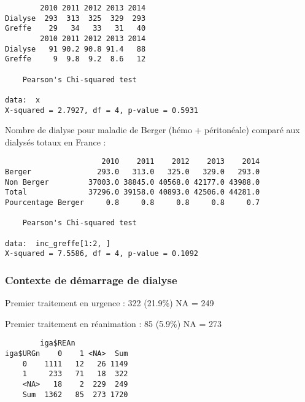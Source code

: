 \documentclass[11pt,a4paper]{article}\usepackage[]{graphicx}\usepackage[]{color}
\makeatletter
\newenvironment{kframe}{%
 \def\at@end@of@kframe{}%
 \ifinner\ifhmode%
  \def\at@end@of@kframe{\end{minipage}}%
  \begin{minipage}{\columnwidth}%
 \fi\fi%
 \def\FrameCommand##1{\hskip\@totalleftmargin \hskip-\fboxsep
 \colorbox{shadecolor}{##1}\hskip-\fboxsep
     \hskip-\linewidth \hskip-\@totalleftmargin \hskip\columnwidth}%
 \MakeFramed {\advance\hsize-\width
   \@totalleftmargin\z@ \linewidth\hsize
   \@setminipage}}%
 {\par\unskip\endMakeFramed%
 \at@end@of@kframe}
\newenvironment{knitrout}{}{} %
\makeatother
\begin{document}
\begin{knitrout}
\color{fgcolor}\begin{kframe}
\begin{verbatim}
        2010 2011 2012 2013 2014
Dialyse  293  313  325  329  293
Greffe    29   34   33   31   40
        2010 2011 2012 2013 2014
Dialyse   91 90.2 90.8 91.4   88
Greffe     9  9.8  9.2  8.6   12

	Pearson's Chi-squared test

data:  x
X-squared = 2.7927, df = 4, p-value = 0.5931
\end{verbatim}
\end{kframe}
\end{knitrout}


Nombre de dialyse pour maladie de Berger (hémo + péritonéale) comparé aux dialysés totaux en France :

\begin{knitrout}
\color{fgcolor}\begin{kframe}
\begin{verbatim}
                      2010    2011    2012    2013    2014
Berger               293.0   313.0   325.0   329.0   293.0
Non Berger         37003.0 38845.0 40568.0 42177.0 43988.0
Total              37296.0 39158.0 40893.0 42506.0 44281.0
Pourcentage Berger     0.8     0.8     0.8     0.8     0.7

	Pearson's Chi-squared test

data:  inc_greffe[1:2, ]
X-squared = 7.5586, df = 4, p-value = 0.1092
\end{verbatim}
\end{kframe}
\end{knitrout}

    \subsubsection{Contexte de démarrage de dialyse}
    
Premier traitement en urgence :  322 (21.9\%) NA = 249

Premier traitement en réanimation :  85 (5.9\%) NA = 273

\begin{knitrout}
\color{fgcolor}\begin{kframe}
\begin{verbatim}
        iga$REAn
iga$URGn    0    1 <NA>  Sum
    0    1111   12   26 1149
    1     233   71   18  322
    <NA>   18    2  229  249
    Sum  1362   85  273 1720
\end{verbatim}
\end{kframe}
\end{knitrout}
\end{document}
